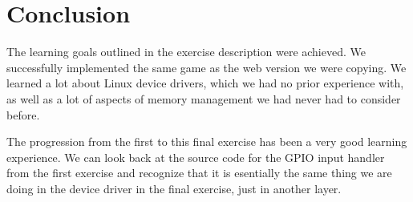 \chapter{Conclusion}
The learning goals outlined in the exercise description were achieved.
We successfully implemented the same game as the web version we were copying.
We learned a lot about Linux device drivers, which we had no prior experience with,
as well as a lot of aspects of memory management we had never had to consider before.

The progression from the first to this final exercise has been a very good learning experience.
We can look back at the source code for the GPIO input handler from the first exercise and recognize that it is esentially the same thing we are doing in the device driver in the final exercise, just in another layer.

